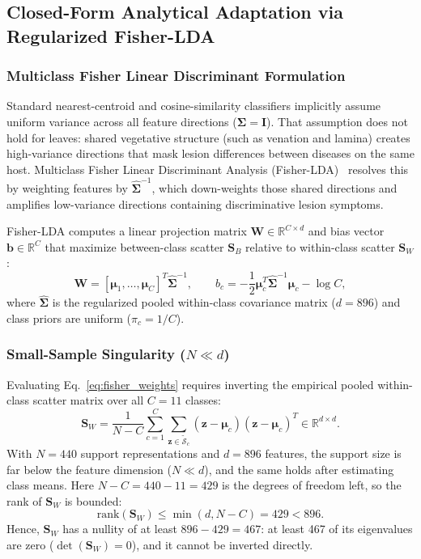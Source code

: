 \documentclass[preprint,12pt]{elsarticle}
\begin{document}
\subsection{Closed-Form Analytical Adaptation via Regularized Fisher-LDA}
\label{sec:fisher_adaptation}

\subsubsection{Multiclass Fisher Linear Discriminant Formulation}
Standard nearest-centroid and cosine-similarity classifiers implicitly assume uniform variance across all feature directions ($\mathbf{\Sigma} = \mathbf{I}$). That assumption does not hold for leaves: shared vegetative structure (such as venation and lamina) creates high-variance directions that mask lesion differences between diseases on the same host. Multiclass Fisher Linear Discriminant Analysis (Fisher-LDA)~\cite{fisher1936use, rao1948utilization} resolves this by weighting features by $\hat{\mathbf{\Sigma}}^{-1}$, which down-weights those shared directions and amplifies low-variance directions containing discriminative lesion symptoms.

Fisher-LDA computes a linear projection matrix $\mathbf{W} \in \mathbb{R}^{C \times d}$ and bias vector $\mathbf{b} \in \mathbb{R}^C$ that maximize between-class scatter $\mathbf{S}_B$ relative to within-class scatter $\mathbf{S}_W$:
\begin{equation}
    \label{eq:fisher_weights}
    \mathbf{W} = [\boldsymbol{\mu}_1, \dots, \boldsymbol{\mu}_C]^T \hat{\mathbf{\Sigma}}^{-1}, \qquad
    b_c = -\frac{1}{2}\boldsymbol{\mu}_c^T \hat{\mathbf{\Sigma}}^{-1}\boldsymbol{\mu}_c - \log C,
\end{equation}
where $\hat{\mathbf{\Sigma}}$ is the regularized pooled within-class covariance matrix ($d = 896$) and class priors are uniform ($\pi_c = 1/C$).

\subsubsection{Small-Sample Singularity \texorpdfstring{($N \ll d$)}{(N << d)}}
Evaluating Eq.~\eqref{eq:fisher_weights} requires inverting the empirical pooled within-class scatter matrix over all $C = 11$ classes:
\begin{equation}
    \label{eq:within_class_scatter}
    \mathbf{S}_W = \frac{1}{N-C}\sum_{c=1}^C \sum_{\mathbf{z} \in \tilde{\mathcal{S}}_c} (\mathbf{z}-\boldsymbol{\mu}_c)(\mathbf{z}-\boldsymbol{\mu}_c)^T \in \mathbb{R}^{d \times d}.
\end{equation}
With $N = 440$ support representations and $d = 896$ features, the support size is far below the feature dimension ($N \ll d$), and the same holds after estimating class means. Here $N - C = 440 - 11 = 429$ is the degrees of freedom left, so the rank of $\mathbf{S}_W$ is bounded:
\begin{equation}
    \label{eq:rank_bound}
    \text{rank}(\mathbf{S}_W) \le \min(d, N-C) = 429 < 896.
\end{equation}
Hence, $\mathbf{S}_W$ has a nullity of at least $896 - 429 = 467$: at least 467 of its eigenvalues are zero ($\det(\mathbf{S}_W) = 0$), and it cannot be inverted directly.
\end{document}
